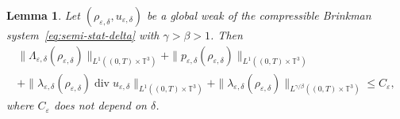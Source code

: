 \documentclass[10pt]{amsart}
\newcommand{\<}{\bigl\langle}
\renewcommand{\>}{\bigr\rangle}
\newtheorem{lem}[thm]{Lemma}
\theoremstyle{definition}
\theoremstyle{remark}
\newcommand{\TT}{\mathbb{T}^3}
\DeclareMathOperator{\Div}{div}
\let\ep\varepsilon
\begin{document}
\begin{lem} Let $(\rho_{\varepsilon, \delta}, u_{\varepsilon,\delta})$ be a global weak
of the compressible Brinkman system~\eqref{eq:semi-stat-delta} with $\gamma > \beta > 1$. Then\vspace*{-3pt}
\begin{multline*}
\|\Lambda_{\varepsilon,\delta}(\rho_{\ep,\delta})\|_{L^1((0,T)\times \TT)} +
\|p_{\varepsilon,\delta}(\rho_{\ep,\delta})\|_{L^1((0,T)\times \TT)}\\
+
\|\lambda_{\varepsilon,\delta}(\rho_{\ep,\delta}) \Div u_{\varepsilon, \delta}\|_{L^1((0,T)\times \TT)}
+ \|\lambda_{\varepsilon,\delta}(\rho_{\varepsilon,\delta})\|_{L^{\gamma/\beta}((0,T)\times \TT)}
\le C_\varepsilon,
\end{multline*}
where $C_\varepsilon$ does not depend on $\delta$.
\end{lem}
\end{document}
